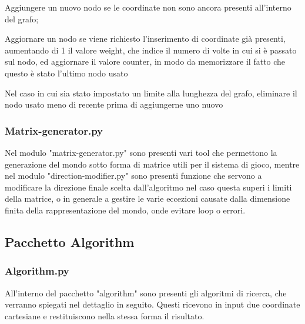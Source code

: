 Aggiungere un nuovo nodo se le coordinate non sono ancora presenti all'interno del grafo;

Aggiornare un nodo se viene richiesto l'inserimento di coordinate già presenti, aumentando di 1 il valore weight, che indice il numero di volte in cui si è passato sul nodo, ed aggiornare il valore counter, in modo da memorizzare il fatto che questo è stato l'ultimo nodo usato

Nel caso in cui sia stato impostato un limite alla lunghezza del grafo, eliminare il nodo usato meno di recente prima di aggiungerne uno nuovo
\subsubsection{Matrix-generator.py}
Nel modulo "matrix-generator.py" sono presenti vari tool che permettono la generazione del mondo sotto forma di matrice utili per il sistema di gioco, mentre nel modulo "direction-modifier.py" sono presenti funzione che servono a modificare la direzione finale scelta dall'algoritmo nel caso questa superi i limiti della matrice, o in generale a gestire le varie eccezioni causate dalla dimensione finita della rappresentazione del mondo, onde evitare loop o errori. 
\subsection{Pacchetto Algorithm}
\subsubsection{Algorithm.py}
All'interno del pacchetto "algorithm" sono presenti gli algoritmi di ricerca, che verranno spiegati nel dettaglio in seguito. Questi ricevono in input due coordinate cartesiane e restituiscono nella stessa forma il risultato.


	
